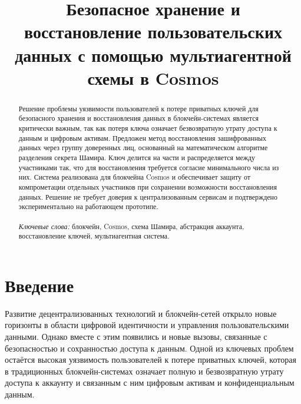 \documentclass[12pt]{a&t}
\begin{document}

\title{Безопасное хранение и восстановление пользовательских данных с помощью мультиагентной схемы в Cosmos}



\let\oldfootnote\footnote
\renewcommand{\footnote}[1]{}
\maketitle
\let\footnote\oldfootnote

\begin{abstract}
Решение проблемы уязвимости пользователей к потере приватных ключей для безопасного хранения и восстановления данных в блокчейн-системах является критически важным, так как потеря ключа означает безвозвратную утрату доступа к данным и цифровым активам. Предложен метод восстановления зашифрованных данных через группу доверенных лиц, основанный на математическом алгоритме разделения секрета Шамира. Ключ делится на части и распределяется между участниками так, что для восстановления требуется согласие минимального числа из них. Система реализована для блокчейна Cosmos и обеспечивает защиту от компрометации отдельных участников при сохранении возможности восстановления данных. Решение не требует доверия к централизованным сервисам и подтверждено экспериментально на работающем прототипе.\\
\\
\textit{Ключевые слова:} блокчейн, Cosmos, схема Шамира, абстракция аккаунта, восстановление ключей, мультиагентная система.
\end{abstract}



\section{Введение}

Развитие децентрализованных технологий и блокчейн-сетей открыло новые горизонты в области цифровой идентичности и управления пользовательскими данными. Однако вместе с этим появились и новые вызовы, связанные с безопасностью и сохранностью доступа к данным. Одной из ключевых проблем остаётся высокая уязвимость пользователей к потере приватных ключей, которая в традиционных блокчейн-системах означает полную и безвозвратную утрату доступа к аккаунту и связанным с ним цифровым активам и конфиденциальным данным.
\end{document}

